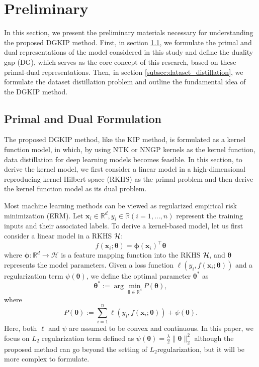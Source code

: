 \section{Preliminary}
\label{Preliminary}
%

In this section, we present the preliminary materials necessary for understanding the proposed DGKIP method.
%
First, in section \ref{subsec:primal_dual_formulation}, we formulate the primal and dual representations of the model considered in this study and define the duality gap (DG), which serves as the core concept of this research, based on these primal-dual representations.
%
Then, in section \ref{subsec:dataset_distillation}, we formulate the dataset distillation problem and outline the fundamental idea of the DGKIP method.


\subsection{Primal and Dual Formulation}
\label{subsec:primal_dual_formulation}
%

The proposed DGKIP method, like the KIP method, is formulated as a kernel function model, in which, by using NTK or NNGP kernels as the kernel function, data distillation for deep learning models becomes feasible.
%
In this section, to derive the kernel model, we first consider a linear model in a high-dimensional reproducing kernel Hilbert space (RKHS) as the primal problem and then derive the kernel function model as its dual problem.


Most machine learning methods can be viewed as regularized empirical risk minimization (ERM).
%
Let $\boldsymbol{x}_i \in \mathbb{R}^d, y_i \in \mathbb{R}(i=1,\ldots,n)$ represent the training inputs and their associated labels.
%
To derive a kernel-based model, let us first consider a linear model in a RKHS ${\cal H}$:
\begin{equation*}
 f(\bm x_i; \bm \theta) = \bm \phi(\bm x_i)^\top \bm \theta
\end{equation*}
where $\bm \phi: \mathbb{R}^d \rightarrow \mathcal{H}$ is a feature mapping function into the RKHS ${\cal H}$, and $\boldsymbol{\theta}$ represents the model parameters.
%
Given a loss function $\ell(y_i, f(\boldsymbol{x}_i; \boldsymbol{\theta}))$ and a regularization term $\psi(\boldsymbol{\theta})$, we define the optimal parameter $\boldsymbol{\theta}^*$ as
\begin{equation}
\boldsymbol{\theta}^* := \arg \min_{\boldsymbol{\theta} \in \mathbb{R}^d} P(\boldsymbol{\theta}),
\label{eq:primal}
\end{equation}
where
\begin{equation*}
 P(\boldsymbol{\theta}) := \sum_{i=1}^n \ell(y_i, f(\boldsymbol{x}_i;\boldsymbol{\theta})) + \psi(\bm \theta).
\end{equation*}
%
Here, both $\ell$ and $\psi$ are assumed to be convex and continuous.
%
In this paper, we focus on $L_2$ regularization term defined as $\psi(\boldsymbol{\theta})=\frac{\lambda}{2}\|\boldsymbol{\boldsymbol{\theta}}\|^2_2$ although the proposed method can go beyond the setting of $L_2$regularization, but it will be more complex to formulate.

